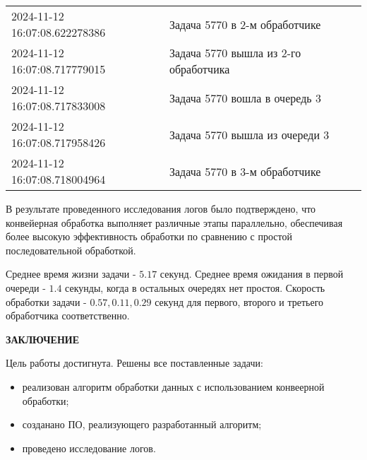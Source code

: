\begin{table}[h]
\begin{center}
\begin{threeparttable}
\begin{tabular}{|l|l|}
                        2024-11-12 16:07:08.622278386 & Задача 5770 в 2-м обработчике\\
                        2024-11-12 16:07:08.717779015 & Задача 5770 вышла из 2-го обработчика\\
                        2024-11-12 16:07:08.717833008 & Задача 5770 вошла в очередь 3\\
                        2024-11-12 16:07:08.717958426 & Задача 5770 вышла из очереди 3\\
                        2024-11-12 16:07:08.718004964 & Задача 5770 в 3-м обработчике\\
                        \hline
                    \end{tabular}
		\end{threeparttable}
    \end{center}
\end{table}

\clearpage

В результате проведенного исследования логов было подтверждено, что
конвейерная обработка выполняет различные этапы параллельно, обеспечивая
более высокую эффективность обработки по сравнению с простой последовательной обработкой.


Среднее время жизни  задачи - $5.17$ секунд.
Среднее время ожидания в первой очереди - $1.4$ секунды, когда в остальных очередях нет
простоя. Скорость обработки  задачи - $0.57, 0.11, 0.29$ секунд для
первого, второго и третьего обработчика соответственно.


\newpage

\begin{center}
    \textbf{ЗАКЛЮЧЕНИЕ}
\end{center}

Цель работы достигнута. Решены все поставленные задачи:
\begin{itemize}
    \item реализован алгоритм обработки данных с использованием конвеерной обработки;
    \item созданано ПО, реализующего разработанный алгоритм;
    \item проведено исследование логов.
\end{itemize}




